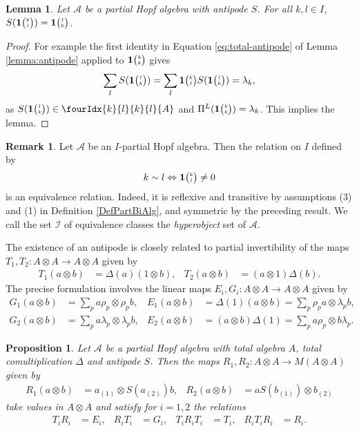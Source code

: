 \documentclass[10pt]{article}
\newcommand{\Grt}[3]{#1{\tiny{\begin{pmatrix} #2\\#3\end{pmatrix}}}}
\newcommand{\UnitC}[2]{\Grt{\mathbf{1}}{#1}{#2}}
\newcommand{\Gr}[5]{\fourIdx{#2}{#4}{#3}{#5}{#1}}%
\newtheorem{Lem}[Theorem]{Lemma}
\newtheorem{Prop}[Theorem]{Proposition}
\theoremstyle{definition}
\newtheorem{Rem}[Theorem]{Remark}
\numberwithin{equation}{section}
\begin{document}
\begin{Lem}\label{LemAntiUnit} Let $\mathscr{A}$ be a partial Hopf algebra with antipode $S$. For all $k,l\in I$, $S(\UnitC{k}{l}) = \UnitC{l}{k}$.
\end{Lem}
\begin{proof} For example the first identity in Equation \eqref{eq:total-antipode} of Lemma \ref{lemma:antipode} applied to $\UnitC{k}{k}$ gives \[\sum_l S(\UnitC{l}{k}) = \sum_l \UnitC{k}{l}S(\UnitC{l}{k}) = \lambda_k,\] as $S(\UnitC{l}{k}) \in \Gr{A}{k}{k}{l}{l}$ and $\Pi^{L}(\UnitC{k}{k}) = \lambda_k$. This implies the lemma.
\end{proof} 
\begin{Rem} \label{remark:index-equivalence}
  Let $\mathscr{A}$ be an $I$-partial Hopf algebra. Then the relation
  on $I$ defined by
  \begin{align*}
    k \sim l \Leftrightarrow \UnitC{k}{l} \neq 0
  \end{align*}
is an equivalence relation. Indeed, it is reflexive and transitive by
assumptions (3) and (1) in Definition \ref{DefPartBiAlg}, and
symmetric by the preceding result. We call the set $\mathscr{I}$ of equivalence classes the \emph{hyperobject} set of $\mathscr{A}$. %
\end{Rem}
The existence of an antipode is closely related to partial invertibility of
the maps $T_{1},T_{2} \colon A \otimes A \to A\otimes A$ given by
\begin{align} \label{eq:wt-12}
  T_{1} (a\otimes b)&= \Delta(a)(1 \otimes b), &
  T_{2} (a\otimes b)&= (a \otimes 1)\Delta(b).
 \end{align}
The precise formulation involves the linear maps $E_{i},G_{i}
 \colon A\otimes A\to A\otimes A$ given by
\begin{align} \label{eq:e1g1}
  G_{1}(a\otimes b) &=
 \sum_{p} a\rho_{p} \otimes \rho_{p}b, &  E_{1}(a \otimes b) &=\Delta(1)(a\otimes b)=\sum_{p} \rho_{p}a\otimes \lambda_{p}b, \\ \label{eq:e2g2}
 G_{2}(a \otimes b) &= \sum_{p} a\lambda_{p} \otimes
    \lambda_{p}b, &
E_{2}(a\otimes b) &= (a\otimes b)\Delta(1)=\sum_{p} a\rho_{p} \otimes b\lambda_{p}.
\end{align}
\begin{Prop} \label{prop:riti}
  Let $\mathscr{A}$ be a partial Hopf algebra with total algebra $A$,
  total comultiplication $\Delta$ and antipode  $S$. Then the maps
  $R_{1},R_{2} \colon A \otimes A \to M(A \otimes A)$ given by
  \begin{align*}
    R_{1}(a \otimes b) &= a_{(1)}\otimes S(a_{(2)})b, &
    R_{2}(a\otimes b) &= aS(b_{(1)})\otimes b_{(2)}
  \end{align*}
  take values in $A\otimes A$ and satisfy for $i=1,2$ the relations
  \begin{align} \label{eq:riti}
    T_{i}R_{i}&=E_{i}, & R_{i}T_{i}&= G_{i}, & T_{i}R_{i}T_{i}&= T_{i}, & R_{i}T_{i}R_{i} &= R_{i}.
  \end{align}
\end{Prop}
\end{document}
